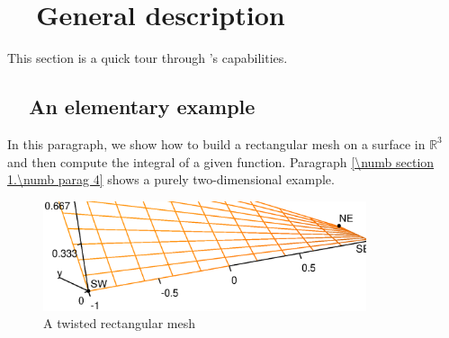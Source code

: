 
\chapter{~~General description}\label{\numb section 1}

This section is a quick tour through \maniFEM's capabilities.


\section{~~An elementary example}\label{\numb section 1.\numb parag 1}

In this paragraph, we show how to build a rectangular mesh on a surface in $ \mathbb{R}^3 $ 
and then compute the integral of a given function.
Paragraph \ref{\numb section 1.\numb parag 4} shows a purely two-dimensional example.

\begin{figure} \centering
  \includegraphics[width=95mm]{3d-rectangle}
  \caption{A twisted rectangular mesh}
  \label{\numb section 1.\numb fig 1}
\end{figure}

